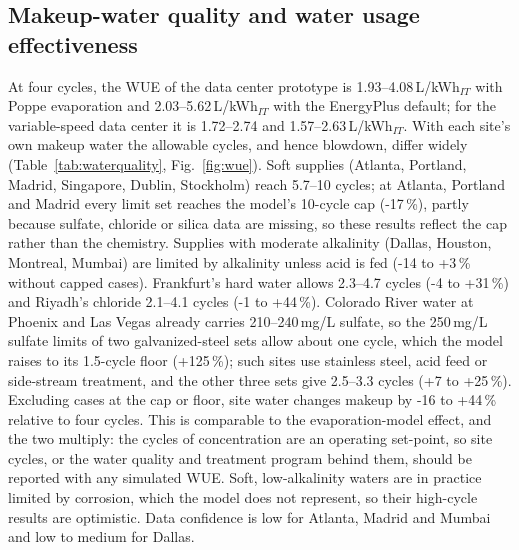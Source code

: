 \documentclass[preprint,12pt]{elsarticle}
\begin{document}
\subsection{Makeup-water quality and water usage effectiveness}\label{sec:wue}
At four cycles, the WUE of the data center prototype is 1.93--4.08\,L/kWh$_{IT}$ with Poppe evaporation and
2.03--5.62\,L/kWh$_{IT}$ with the EnergyPlus default; for the variable-speed data center it is 1.72--2.74 and
1.57--2.63\,L/kWh$_{IT}$. With each site's own makeup water the allowable cycles, and hence blowdown, differ widely
(Table~\ref{tab:waterquality}, Fig.~\ref{fig:wue}). Soft supplies (Atlanta, Portland, Madrid, Singapore, Dublin, Stockholm)
reach 5.7--10 cycles; at Atlanta, Portland and Madrid every limit set reaches the model's 10-cycle cap (-17\,\%), partly
because sulfate, chloride or silica data are missing, so these results reflect the cap rather than the chemistry.
Supplies with moderate alkalinity (Dallas, Houston, Montreal, Mumbai) are limited by alkalinity unless acid is fed
(-14 to +3\,\% without capped cases). Frankfurt's hard water allows 2.3--4.7 cycles (-4 to +31\,\%) and Riyadh's
chloride 2.1--4.1 cycles (-1 to +44\,\%). Colorado River water at Phoenix and Las Vegas already carries 210--240\,mg/L
sulfate, so the 250\,mg/L sulfate limits of two galvanized-steel sets allow about one cycle, which the model raises to its
1.5-cycle floor (+125\,\%); such sites use stainless steel, acid feed or side-stream treatment, and the other three sets give
2.5--3.3 cycles (+7 to +25\,\%). Excluding cases at the cap or floor, site water changes makeup by -16 to +44\,\% relative
to four cycles. This is comparable to the evaporation-model effect, and the two multiply: the cycles of concentration are
an operating set-point, so site cycles, or the water quality and treatment program behind them, should be reported with
any simulated WUE. Soft, low-alkalinity waters are in practice limited by corrosion, which the model does not represent,
so their high-cycle results are optimistic. Data confidence is low for Atlanta, Madrid and Mumbai and low to medium for
Dallas.

\begin{table}[t]\centering\scriptsize
\caption{Data center prototype: site makeup water and cycles of concentration. Data: confidence of the water-quality data
(H high, M medium, L low); $^\dagger$sulfate, chloride or silica missing (treated as non-limiting). $N_{c,\mathrm{eff}}$:
effective annual cycles $E/(B+D_r)+1$, range over the five limit sets. $\Delta$WUE: Poppe makeup per IT energy relative to
four cycles, over all sets ($^c$lower end at the 10-cycle cap; $^f$upper end at the 1.5-cycle floor) and over the sets at
neither bound (``--'': none). ``min.'': raised to the 1.5-cycle minimum.}\label{tab:waterquality}
\resizebox{\linewidth}{!}{}
\end{table}
\end{document}
